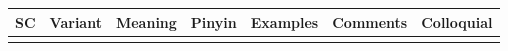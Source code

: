 \documentclass[fontsize=12pt,
			 parskip=full,
			 a4paper,
			 landscape,
			 pagesize,
			 DIV=12]{scrreprt}
\begin{document}
\begin{longtable}{|>{\large}c|>{\large}c|p{5cm}|p{1.5cm}|>{\large}l|p{7cm}|p{2.5cm}|}
\hline
\normalsize\bfseries SC & \normalsize\bfseries \normalsize\bfseries Variant & \bfseries Meaning & \bfseries Pinyin & \normalsize\bfseries Examples & \bfseries Comments & \bfseries Colloquial \\ \hline
\endhead
\hline
\endfoot

\end{longtable}
\end{document}
